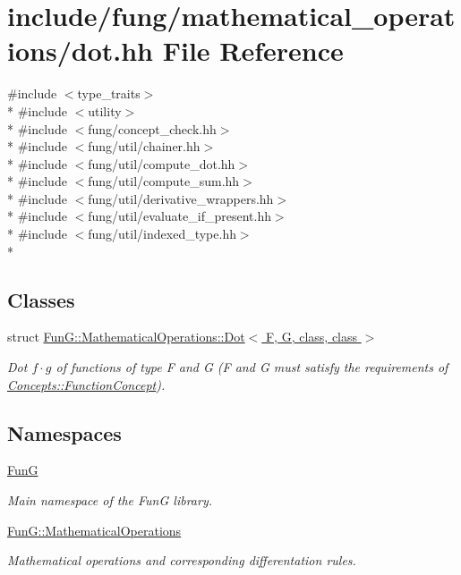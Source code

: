 \hypertarget{dot_8hh}{}\section{include/fung/mathematical\+\_\+operations/dot.hh File Reference}
\label{dot_8hh}
{\ttfamily \#include $<$type\+\_\+traits$>$}\\*
{\ttfamily \#include $<$utility$>$}\\*
{\ttfamily \#include $<$fung/concept\+\_\+check.\+hh$>$}\\*
{\ttfamily \#include $<$fung/util/chainer.\+hh$>$}\\*
{\ttfamily \#include $<$fung/util/compute\+\_\+dot.\+hh$>$}\\*
{\ttfamily \#include $<$fung/util/compute\+\_\+sum.\+hh$>$}\\*
{\ttfamily \#include $<$fung/util/derivative\+\_\+wrappers.\+hh$>$}\\*
{\ttfamily \#include $<$fung/util/evaluate\+\_\+if\+\_\+present.\+hh$>$}\\*
{\ttfamily \#include $<$fung/util/indexed\+\_\+type.\+hh$>$}\\*
\subsection*{Classes}
\begin{DoxyCompactItemize}
\item 
struct \hyperlink{structFunG_1_1MathematicalOperations_1_1Dot}{Fun\+G\+::\+Mathematical\+Operations\+::\+Dot$<$ F, G, class, class $>$}
\begin{DoxyCompactList}\small\item\em Dot $f \cdot g$ of functions of type F and G (F and G must satisfy the requirements of \hyperlink{structFunG_1_1Concepts_1_1FunctionConcept}{Concepts\+::\+Function\+Concept}). \end{DoxyCompactList}\end{DoxyCompactItemize}
\subsection*{Namespaces}
\begin{DoxyCompactItemize}
\item 
 \hyperlink{namespaceFunG}{FunG}
\begin{DoxyCompactList}\small\item\em Main namespace of the FunG library. \end{DoxyCompactList}\item 
 \hyperlink{namespaceFunG_1_1MathematicalOperations}{Fun\+G\+::\+Mathematical\+Operations}
\begin{DoxyCompactList}\small\item\em Mathematical operations and corresponding differentation rules. \end{DoxyCompactList}\end{DoxyCompactItemize}
